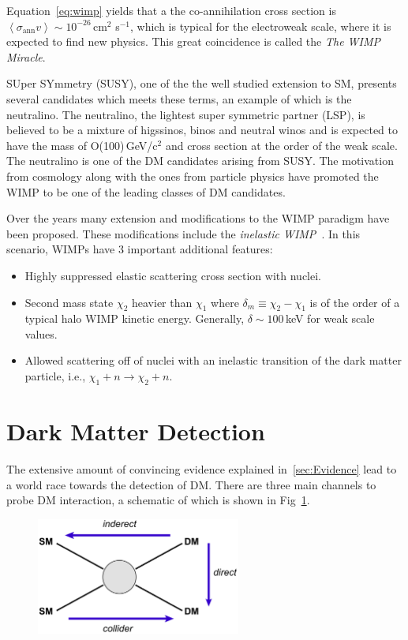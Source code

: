Equation~\ref{eq:wimp} yields that a the co-annihilation cross section is $\left<\sigma_{\mathrm{ann}}v\right> \sim 10^{-26}$\,cm$^2$ s$^{-1}$, which is typical for the electroweak scale, where it is expected to find new physics. This great coincidence is called the \textit{The WIMP Miracle}.

SUper SYmmetry (SUSY), one of the the well studied extension to SM, presents several candidates which meets these terms, an example of which is the neutralino. The neutralino, the lightest super symmetric partner (LSP), is believed to be a mixture of higssinos, binos and neutral winos and is expected to have the mass of O(100)\,GeV/c$^2$ and cross section at the order of the weak scale. The neutralino is one of the DM candidates arising from SUSY. The motivation from cosmology along with the ones from particle physics have promoted the WIMP to be one of the leading classes of DM candidates. 

Over the years many extension and modifications to the WIMP paradigm have been proposed. These modifications include the \textit{inelastic WIMP}~\cite{InelasticIntro}. In this scenario, WIMPs have 3 important additional features:
\begin{itemize}
\item Highly suppressed elastic scattering cross section with nuclei.
\item Second mass state $\chi_2$ heavier than $\chi_1$ where $\delta_m \equiv \chi_2 - \chi_1$ is of the order of a typical halo WIMP kinetic energy. Generally, $\delta \sim 100$\,keV for weak scale values. 
\item Allowed scattering off of nuclei with an inelastic transition of the dark matter particle, i.e., $\chi_1 + n \rightarrow \chi_2 + n$.
\end{itemize}




\section{Dark Matter Detection}
\label{sec:DMDet}

The extensive amount of convincing evidence explained in~\ref{sec:Evidence} lead to a world race towards the detection of DM. There are three main channels to probe DM interaction, a schematic of which is shown in Fig~\ref{fig:detectionScheme}.

\begin{figure}[]
	\centering
	\includegraphics[width=0.6\textwidth]{figs/detection_channels.png}
	\label{fig:detectionScheme}
\end{figure}  

